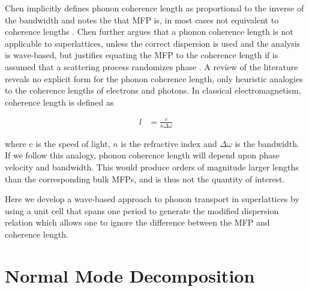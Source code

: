 Chen implicitly defines phonon coherence length as proportional to the inverse of the bandwidth and notes the that MFP is, in most cases not equivalent to coherence lengths \cite {Chen_particularities,chen2005nanoscale}. Chen further argues that a phonon coherence length is not applicable to superlattices, unless the correct dispersion is used and the analysis is wave-based\cite{chen:945}, but justifies equating the MFP to the coherence length if is assumed that a scattering process randomizes phase \cite{PhysRevB.67.195311}. A review of the literature reveals no explicit form for the phonon coherence length, only heuristic analogies to the coherence lengths of electrons and photons. In classical electromagnetism, coherence length is defined as

\begin{equation}\label{EQ:Coh2}
\begin{split}
l &= \frac{c}{n\Delta \omega} 
\end{split}
\end{equation}

where c is the speed of light, $n$ is the refractive index and $\Delta \omega$ is the bandwidth. If we follow this analogy, phonon coherence length will depend upon phase velocity and bandwidth. This would produce orders of magnitude larger lengths than the corresponding bulk MFPs, and is thus not the quantity of interest.



Here we develop a wave-based approach to phonon transport in superlattices by using a unit cell that spans one period to generate the modified dispersion relation which allows one to ignore the difference between the MFP and coherence length.

\section{Normal Mode Decomposition}


